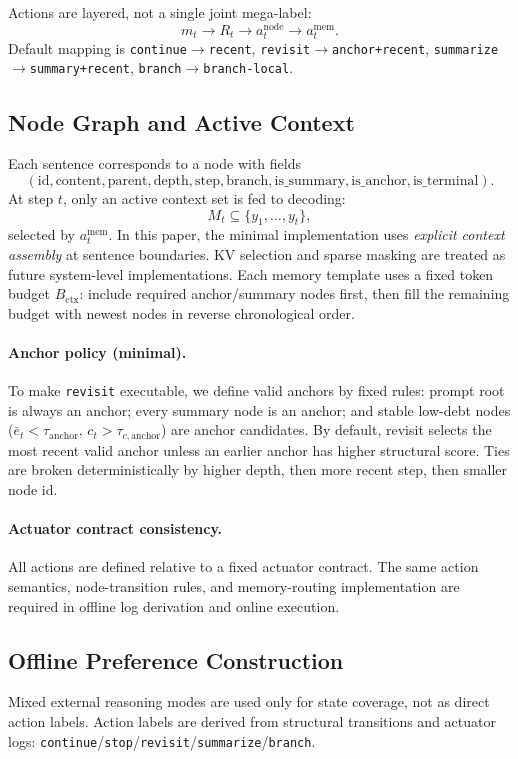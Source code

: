 \documentclass{article}
\begin{document}
Actions are layered, not a single joint mega-label:
\[
m_t \rightarrow R_t \rightarrow a_t^{\text{node}} \rightarrow a_t^{\text{mem}}.
\]
Default mapping is
\texttt{continue}$\rightarrow$\texttt{recent},
\texttt{revisit}$\rightarrow$\texttt{anchor+recent},
\texttt{summarize}$\rightarrow$\texttt{summary+recent},
\texttt{branch}$\rightarrow$\texttt{branch-local}.

\subsection{Node Graph and Active Context}
\label{sec:graph}
Each sentence corresponds to a node with fields
\[
(\text{id},\text{content},\text{parent},\text{depth},\text{step},\text{branch},\text{is\_summary},\text{is\_anchor},\text{is\_terminal}).
\]
At step $t$, only an active context set is fed to decoding:
\[
M_t \subseteq \{y_1,\dots,y_t\},
\]
selected by $a_t^{\text{mem}}$. In this paper, the minimal implementation uses \emph{explicit context assembly} at sentence boundaries. KV selection and sparse masking are treated as future system-level implementations. Each memory template uses a fixed token budget $B_{\mathrm{ctx}}$: include required anchor/summary nodes first, then fill the remaining budget with newest nodes in reverse chronological order.

\paragraph{Anchor policy (minimal).}
To make \texttt{revisit} executable, we define valid anchors by fixed rules: prompt root is always an anchor; every summary node is an anchor; and stable low-debt nodes ($\bar e_t<\tau_{\mathrm{anchor}}$, $c_t>\tau_{c,\mathrm{anchor}}$) are anchor candidates. By default, revisit selects the most recent valid anchor unless an earlier anchor has higher structural score. Ties are broken deterministically by higher depth, then more recent step, then smaller node id.

\paragraph{Actuator contract consistency.}
All actions are defined relative to a fixed actuator contract. The same action semantics, node-transition rules, and memory-routing implementation are required in offline log derivation and online execution.

\subsection{Offline Preference Construction}
\label{sec:offline}
Mixed external reasoning modes are used only for state coverage, not as direct action labels. Action labels are derived from structural transitions and actuator logs:
\texttt{continue}/\texttt{stop}/\texttt{revisit}/\texttt{summarize}/\texttt{branch}.
\end{document}
